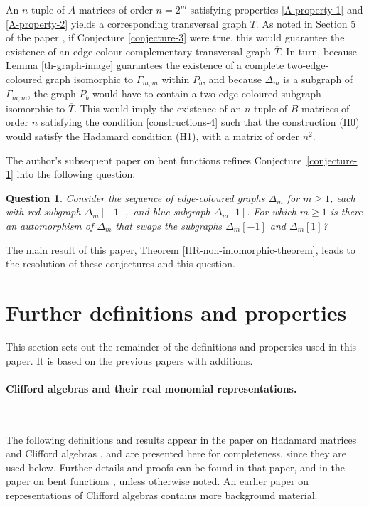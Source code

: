 \documentclass[11pt,a4paper]{jacodesmath}
\newtheorem{question}{Question}
\begin{document}
An $n$-tuple of $A$ matrices of order $n=2^m$ satisfying properties \eqref{A-property-1} and
\eqref{A-property-2}
yields a corresponding transversal graph $T$.
As noted in Section 5 of the paper  \cite{Leo14Constructions},
if Conjecture \ref{conjecture-3} were true, this would guarantee the existence
of an edge-colour complementary transversal graph $\overline{T}$.
In turn, because Lemma \ref{th-graph-image} guarantees the existence of a complete two-edge-coloured
graph
isomorphic to $\varGamma_{m,m}$ within $P_b$, and because $\varDelta_m$ is a subgraph of
$\varGamma_{m,m}$,
the graph $P_b$ would have to contain a two-edge-coloured subgraph isomorphic to $\overline{T}$.
This would imply the existence of an $n$-tuple of $B$ matrices of order $n$ satisfying the condition
\eqref{constructions-4}
such that the construction (H0) would satisfy the Hada\-mard condition (H1), with a matrix of order
$n^2$.

The author's subsequent paper on bent functions \cite{Leo15Twin}
refines Conjecture~\ref{conjecture-1} into the following question.
\begin{question}
\label{Question-1}
Consider the sequence of edge-coloured graphs $\varDelta_m$ for $m \geqslant 1$,
each with red subgraph $\varDelta_m[-1],$ and blue subgraph $\varDelta_m[1].$
For which $m \geqslant 1$ is there an automorphism of $\varDelta_m$
that swaps the subgraphs $\varDelta_m[-1]$ and $\varDelta_m[1]$?
\end{question}

The main result of this paper, Theorem \ref{HR-non-imomorphic-theorem},
leads to the resolution of these conjectures and this question.

\section{Further definitions and properties}
\label{sec-Preliminaries}
This section sets out the remainder of the definitions and properties used in this paper.
It is based on the previous papers \cite{Leo14Constructions, Leo15Twin} with additions.

\paragraph*{Clifford algebras and their real monomial representations.}
\label{sec-Clifford}

~

The following definitions and results appear in the paper on Hada\-mard matrices and Clifford
algebras \cite{Leo14Constructions},
and are presented here for completeness, since they are used below.
Further details and proofs can be found in that paper, and in the paper on bent functions
\cite{Leo15Twin},
unless otherwise noted.
An earlier paper on representations of Clifford algebras \cite{Leo05} contains more background
material.
\end{document}
